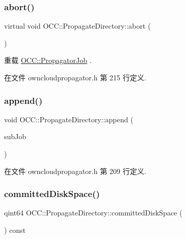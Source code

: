 \subsubsection{\texorpdfstring{abort()}{abort()}}
{\footnotesize\ttfamily virtual void O\+C\+C\+::\+Propagate\+Directory\+::abort (\begin{DoxyParamCaption}{ }\end{DoxyParamCaption})\hspace{0.3cm}{\ttfamily [virtual]}}



重载 \hyperlink{class_o_c_c_1_1_propagator_job_a0d33573c817a705179a87db936b8dcb4}{O\+C\+C\+::\+Propagator\+Job} .



在文件 owncloudpropagator.\+h 第 215 行定义.

\mbox{\label{class_o_c_c_1_1_propagate_directory_abaa9fdc3c191246c698072e29dd924d8}} 
\subsubsection{\texorpdfstring{append()}{append()}}
{\footnotesize\ttfamily void O\+C\+C\+::\+Propagate\+Directory\+::append (\begin{DoxyParamCaption}\item[{\hyperlink{class_o_c_c_1_1_propagator_job}{Propagator\+Job} $\ast$}]{sub\+Job }\end{DoxyParamCaption})}



在文件 owncloudpropagator.\+h 第 209 行定义.

\mbox{\label{class_o_c_c_1_1_propagate_directory_ae5794c246607f879d1715ea94b0d18e1}} 
\subsubsection{\texorpdfstring{committed\+Disk\+Space()}{committedDiskSpace()}}
{\footnotesize\ttfamily qint64 O\+C\+C\+::\+Propagate\+Directory\+::committed\+Disk\+Space (\begin{DoxyParamCaption}{ }\end{DoxyParamCaption}) const\hspace{0.3cm}{\ttfamily [virtual]}}

